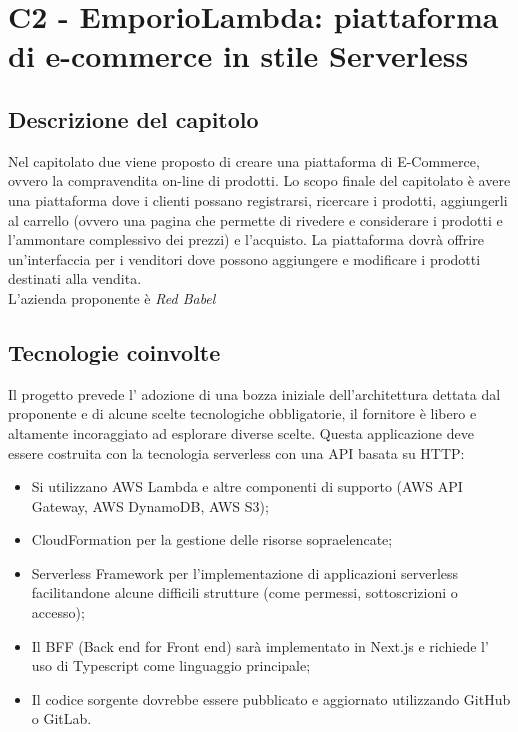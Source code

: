 \section{C2 - EmporioLambda: piattaforma di e-commerce in stile Serverless}

\subsection{Descrizione del capitolo}
Nel capitolato due viene proposto di creare una piattaforma di E-Commerce, ovvero la compravendita on-line di prodotti.
Lo scopo finale del capitolato è avere una piattaforma dove i clienti possano registrarsi, ricercare i prodotti, aggiungerli al carrello (ovvero una pagina che permette di rivedere e considerare i prodotti e l'ammontare complessivo dei prezzi) e l'acquisto. La piattaforma dovrà offrire un'interfaccia per i venditori dove possono aggiungere e modificare i prodotti destinati alla vendita.\\
L'azienda proponente è \textit{Red Babel}

\subsection{Tecnologie coinvolte}
Il progetto prevede l' adozione di una bozza iniziale dell'architettura dettata dal proponente e di alcune scelte tecnologiche obbligatorie, il fornitore è libero e altamente incoraggiato ad esplorare diverse scelte.
Questa applicazione deve essere costruita con la tecnologia serverless con una API basata su HTTP:
\begin{itemize}
\item	Si utilizzano AWS Lambda e altre componenti di supporto (AWS API Gateway, AWS DynamoDB, AWS S3);
\item	CloudFormation per la gestione delle risorse sopraelencate;
\item	Serverless Framework per l’implementazione di applicazioni serverless facilitandone alcune difficili strutture (come permessi, sottoscrizioni o accesso);
\item	Il BFF (Back end for Front end) sarà implementato in Next.js e richiede l' uso di Typescript come linguaggio principale;
\item	Il codice sorgente dovrebbe essere pubblicato e aggiornato utilizzando GitHub o GitLab.
\end{itemize}

